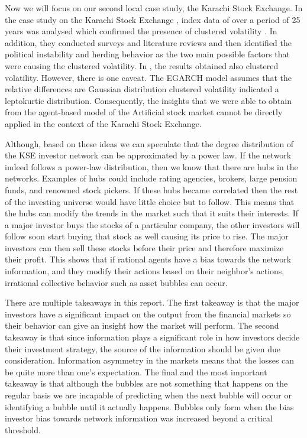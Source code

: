 \documentclass[runningheads]{llncs}
\begin{document}
Now we will focus on our second local case study, the Karachi Stock Exchange. In the case study on the Karachi Stock Exchange , index data of over a period of 25 years was analysed which confirmed the presence of clustered volatility \cite{ref_lncs4}. In addition, they conducted surveys and literature reviews and then identified the political instability and herding behavior as the two main possible factors that were causing the clustered volatility. In \cite{ref_lncs3}, the results obtained also clustered volatility. However, there is one caveat. The EGARCH model assumes that the relative differences are Gaussian distribution \cite{ref_lncs3} clustered volatility indicated a leptokurtic distribution. Consequently, the insights that we were able to obtain from the agent-based model of the Artificial stock market cannot be directly applied in the context of the Karachi Stock Exchange. 

Although, based on these ideas we can speculate that the degree distribution of the KSE investor network can be approximated by a power law. If the network indeed follows a power-law distribution, then we know that there are hubs in the networks. Examples of hubs could include rating agencies, brokers, large pension funds, and renowned stock pickers. If these hubs became correlated then the rest of the investing universe would have little choice but to follow. This means that the hubs can modify the trends in the market such that it suits their interests. If a major investor buys the stocks of a particular company, the other investors will follow soon start buying that stock as well causing its price to rise. The major investors can then sell these stocks before their price and therefore maximize their profit. This shows that if rational agents have a bias towards the network information, and they modify their actions based on their neighbor's actions, irrational collective behavior such as asset bubbles can occur.

There are multiple takeaways in this report. The first takeaway is that the major investors have a significant impact on the output from the financial markets so their behavior can give an insight how the market will perform. The second takeaway is that since information plays a significant role in how investors decide their investment strategy, the source of the information should be given due consideration. Information asymmetry in the markets means that the losses can be quite more than one's expectation. The final and the most important takeaway is that although the bubbles are not something that happens on the regular basis we are incapable of predicting when the next bubble will occur or identifying a bubble until it actually happens. Bubbles only form when the bias investor bias towards network information was increased beyond a critical threshold. 
\end{document}
